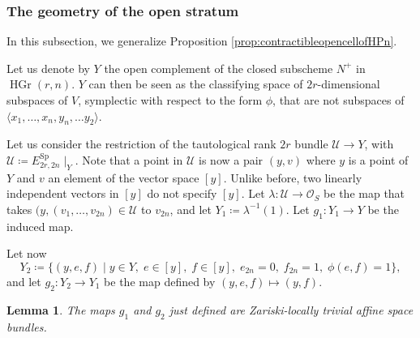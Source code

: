 \documentclass[10pt]{amsart}
\theoremstyle{definition}
\theoremstyle{plain}
\newtheorem{lemma}[defn]{Lemma}
\numberwithin{equation}{section}
\newcommand{\0}{\emptyset}
\newcommand{\Sp}{{\operatorname{Sp}}}
\newcommand{\HGr}{{\operatorname{HGr}}}
\begin{document}
\subsubsection{The geometry of the open stratum}
\label{sub:opencells}

In this subsection, we generalize Proposition \ref{prop:contractibleopencellofHPn}.

Let us denote by $Y$ the open complement of the closed subscheme $N^+$ in $\HGr(r,n)$. $Y$ can then be seen as the classifying space of $2r$-dimensional subspaces of $V$, symplectic with respect to the form $\phi$, that are not subspaces of $\langle x_1, \ldots, x_n,y_n, \ldots y_2 \rangle$.  

Let us consider the restriction of the tautological rank $2r$ bundle $\mathcal{U} \to Y$, with $\mathcal{U}\coloneqq E^\Sp_{2r,2n} \mid_Y$. Note that a point in $\mathcal{U}$ is now a pair $(y,v)$ where $y$ is a point of $Y$ and $v$ an element of the vector space $[y]$. Unlike before, two linearly independent vectors in $[y]$ do not specify $[y]$. Let $\lambda:\mathcal{U} \to \mathcal{O}_S$ be the map that takes $(y,(v_1,\ldots, v_{2n})\in \mathcal{U}$ to $v_{2n}$, and let $Y_1 \coloneqq \lambda^{-1}(1)$. Let $g_1:Y_1 \to Y$ be the induced map.

Let now
$$Y_2 \coloneqq \{(y,e,f) \mid y \in Y, \;e \in [y],\; f \in [y], \; e_{2n}=0, \; f_{2n}=1, \; \phi(e,f)=1 \},$$
and let $g_2:Y_2 \to Y_1$ be the map defined by $(y,e,f) \mapsto (y,f)$.

\begin{lemma}
    The maps $g_1$ and $g_2$ just defined are Zariski-locally trivial affine space bundles.
\end{lemma}
\end{document}
